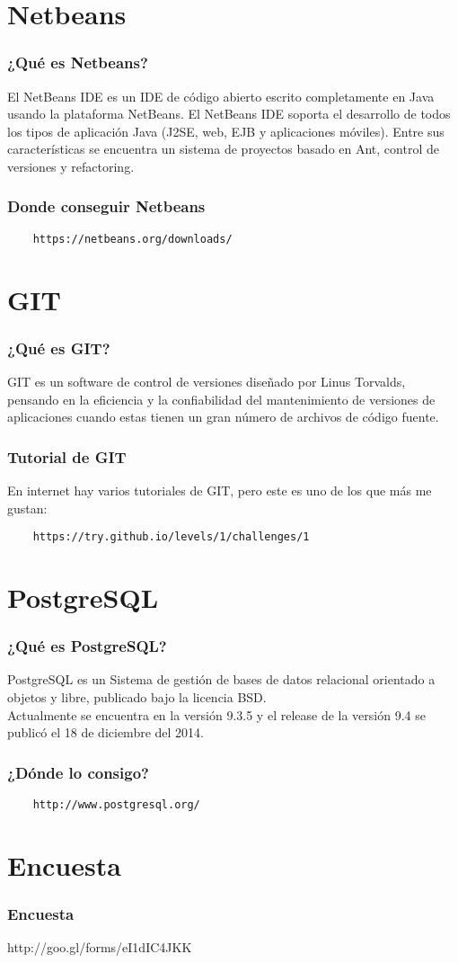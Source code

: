 \documentclass{beamer}
\begin{document}
\section{Netbeans}

\begin{frame}
  \frametitle{¿Qué es Netbeans?}
  El NetBeans IDE es un IDE de código abierto escrito completamente en Java
  usando la plataforma NetBeans. El NetBeans IDE soporta el desarrollo de todos
  los tipos de aplicación Java (J2SE, web, EJB y aplicaciones móviles). Entre
  sus características se encuentra un sistema de proyectos basado en Ant,
  control de versiones y refactoring.
\end{frame}


\begin{frame}[fragile]
  \frametitle{Donde conseguir Netbeans}
  \begin{verbatim}
    https://netbeans.org/downloads/
  \end{verbatim}
\end{frame}

\section{GIT}

\begin{frame}
  \frametitle{¿Qué es GIT?}
  GIT es un software de control de versiones diseñado por Linus Torvalds,
  pensando en la eficiencia y la confiabilidad del mantenimiento de versiones de
  aplicaciones cuando estas tienen un gran número de archivos de código fuente.
\end{frame}

\begin{frame}[fragile]
  \frametitle{Tutorial de GIT}
  En internet hay varios tutoriales de GIT, pero este es uno de los que más me
  gustan:
  \begin{verbatim}
    https://try.github.io/levels/1/challenges/1
  \end{verbatim}
\end{frame}

\section{PostgreSQL}

\begin{frame}
  \frametitle{¿Qué es PostgreSQL?}
  PostgreSQL es un Sistema de gestión de bases de datos relacional orientado a
  objetos y libre, publicado bajo la licencia BSD.\\
  Actualmente se encuentra en la versión 9.3.5 y el release de la versión 9.4
  se publicó el 18 de diciembre del 2014.
\end{frame}

\begin{frame}[fragile]
  \frametitle{¿Dónde lo consigo?}
  \begin{verbatim}
    http://www.postgresql.org/
  \end{verbatim}
\end{frame}
\section{Encuesta}
\begin{frame}
  \frametitle{Encuesta}
  http://goo.gl/forms/eI1dIC4JKK
\end{frame}
\end{document}
